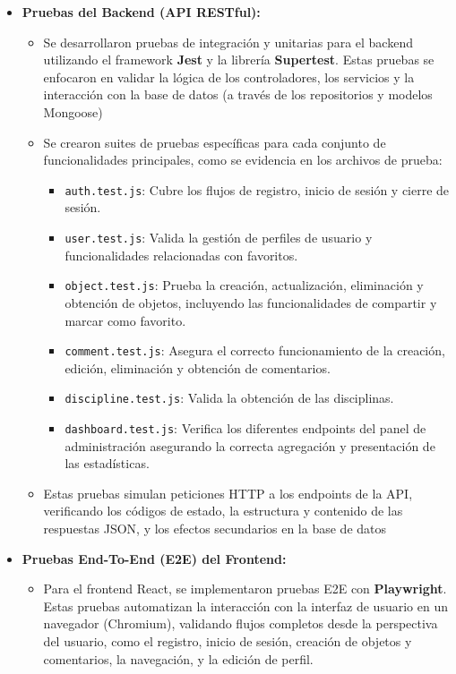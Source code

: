 \begin{itemize}
    \item \textbf{Pruebas del Backend (API RESTful):}
    \begin{itemize}
        \item Se desarrollaron pruebas de integración y unitarias para el backend utilizando el framework \textbf{Jest} y la librería \textbf{Supertest}. Estas pruebas se enfocaron en validar la lógica de los controladores, los servicios y la interacción con la base de datos (a través de los repositorios y modelos Mongoose)
        \item Se crearon suites de pruebas específicas para cada conjunto de funcionalidades principales, como se evidencia en los archivos de prueba:
        \begin{itemize}
            \item \texttt{auth.test.js}: Cubre los flujos de registro, inicio de sesión y cierre de sesión.
            \item \texttt{user.test.js}: Valida la gestión de perfiles de usuario y funcionalidades relacionadas con favoritos.
            \item \texttt{object.test.js}: Prueba la creación, actualización, eliminación y obtención de objetos, incluyendo las funcionalidades de compartir y marcar como favorito.
            \item \texttt{comment.test.js}: Asegura el correcto funcionamiento de la creación, edición, eliminación y obtención de comentarios.
            \item \texttt{discipline.test.js}: Valida la obtención de las disciplinas.
            \item \texttt{dashboard.test.js}: Verifica los diferentes endpoints del panel de administración asegurando la correcta agregación y presentación de las estadísticas.
        \end{itemize}
        \item Estas pruebas simulan peticiones HTTP a los endpoints de la API, verificando los códigos de estado, la estructura y contenido de las respuestas JSON, y los efectos secundarios en la base de datos
    \end{itemize}
    \vspace{0.3cm}
    \item \textbf{Pruebas End-To-End (E2E) del Frontend:}
    \begin{itemize}
        \item Para el frontend React, se implementaron pruebas E2E con \textbf{Playwright}. Estas pruebas automatizan la interacción con la interfaz de usuario en un navegador (Chromium), validando flujos completos desde la perspectiva del usuario, como el registro, inicio de sesión, creación de objetos y comentarios, la navegación, y la edición de perfil.

\end{itemize}
\end{itemize}
